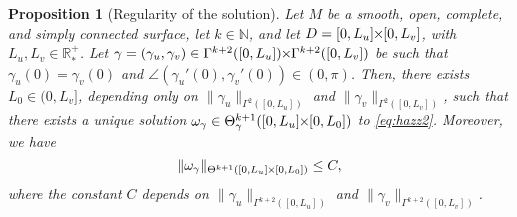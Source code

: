 \documentclass{article}
\newcommand{\PLH}{{\mkern-1mu\times\mkern-1mu}}
\newcommand{\Times}{\PLH}
\newcommand{\R}{\mathbb{R}}
\newcommand{\surf}{M}
\newcommand{\EN}{\mathbb{N}}
\newtheorem{proposition}[theorem]{Proposition}
\theoremstyle{remark}
\theoremstyle{prpart}
\begin{document}
\begin{proposition}[Regularity of the solution]\label{prop2}
  Let $\surf$ be a smooth, open, complete, and simply connected surface, let $k\in\EN$, and let $D=[0,L_u]\Times[0,L_v]$, with $L_u,L_v\in\R^+_\ast$. Let $\gamma=(\gamma_u,\gamma_v) \in \Gamma^{k+2}([0,L_u])\Times\Gamma^{k+2}([0,L_v])$ be such that $\gamma_u(0)=\gamma_v(0)$ and $\angle(\gamma_u'(0),\gamma_v'(0))\in(0,\pi)$. Then, there exists $L_0\in(0,L_v]$, depending only on $\|\gamma_u\|_{\Gamma^2([0,L_u])}$ and $\|\gamma_v\|_{\Gamma^2([0,L_v])}$, such that there exists a unique solution $\omega_\gamma \in  \Theta^{k+1}_\gamma([0,L_u]\Times[0,L_0])$ to \eqref{eq:hazz2}. Moreover, we have
\begin{equation}\label{eq:borne-k}
  \|\omega_\gamma\|_{\Theta^{k+1}([0,L_u]\Times[0,L_0])}\leq C,
\end{equation}
where the constant $C$ depends on $\|\gamma_u\|_{\Gamma^{k+2}([0,L_u])}$ and $\|\gamma_v\|_{\Gamma^{k+2}([0,L_v])}$.
\end{proposition}
\end{document}
